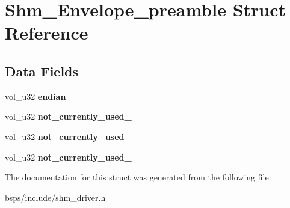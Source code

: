 \hypertarget{structShm__Envelope__preamble}{}\section{Shm\+\_\+\+Envelope\+\_\+preamble Struct Reference}
\label{structShm__Envelope__preamble}
\subsection*{Data Fields}
\begin{DoxyCompactItemize}
\item 
\mbox{\label{structShm__Envelope__preamble_ac813c4167d6980bdddbfc712284ebf53}} 
vol\+\_\+u32 {\bfseries endian}
\item 
\mbox{\label{structShm__Envelope__preamble_aa3b2118362c5061fd0b0bb83bd563420}} 
vol\+\_\+u32 {\bfseries not\+\_\+currently\+\_\+used\+\_}
\item 
\mbox{\label{structShm__Envelope__preamble_a976a11ecbe9430733eeaa56b187c6f47}} 
vol\+\_\+u32 {\bfseries not\+\_\+currently\+\_\+used\+\_}
\item 
\mbox{\label{structShm__Envelope__preamble_a3610c84696560e5a44150d2e13ceb19c}} 
vol\+\_\+u32 {\bfseries not\+\_\+currently\+\_\+used\+\_}
\end{DoxyCompactItemize}


The documentation for this struct was generated from the following file\+:\begin{DoxyCompactItemize}
\item 
bsps/include/shm\+\_\+driver.\+h\end{DoxyCompactItemize}
